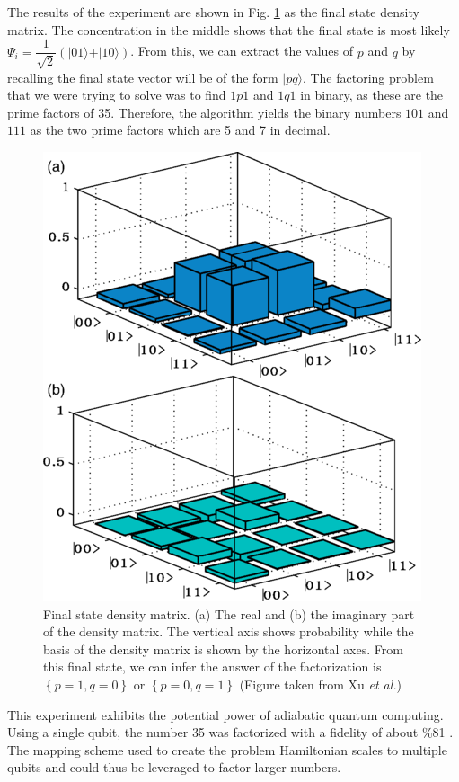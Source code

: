 \documentclass[%
 reprint,
 amsmath,amssymb,
 aps,
]{revtex4-1}
\begin{document}
	The results of the experiment are shown in Fig. \ref{fig:densitymatrix} as the final state density matrix. The concentration in the middle shows that the final state is most likely $\Psi_i = \dfrac{1}{\sqrt{2}}\left(\vert 01 \rangle + \vert 10 \rangle   \right)$. From this, we can extract the values of $p$ and $q$ by recalling the final state vector will be of the form $\vert pq \rangle$. The factoring problem that we were trying to solve was to find $1p1$ and $1q1$ in binary, as these are the prime factors of 35. Therefore, the algorithm yields the binary numbers $101$ and $111$ as the two prime factors which are 5 and 7 in decimal.
	
	\begin{figure}
	\includegraphics[scale=0.49]{Fig3XuEtAl}
	\caption{	
		Final state density matrix. (a) The real and (b) the imaginary part of the density matrix. The vertical axis shows probability while the basis of the density matrix is shown by the horizontal axes. From this final state, we can infer the answer of the factorization is $\left\lbrace p=1, q=0 \right\rbrace$ or $\left\lbrace p=0, q=1 \right\rbrace$ (Figure taken from Xu \textit{et al.}\cite{Xu2017})
	}
	\label{fig:densitymatrix}	
	\end{figure}
	
	
	This experiment exhibits the potential power of adiabatic quantum computing. Using a single qubit, the number 35 was factorized with a fidelity of about \%81 \cite{Xu2017}. The mapping scheme used to create the problem Hamiltonian scales to multiple qubits and could thus be leveraged to factor larger numbers.
	
\end{document}
